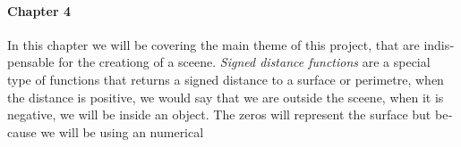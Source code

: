 \begin{otherlanguage}{english}
\paragraph{Chapter 4} In this chapter we will be covering the main theme of this project, that are indispensable for the creationg of a sceene. \textit{Signed distance functions} are a special type of functions that returns a signed distance to a surface or perimetre, when the distance is positive, we would say that we are outside the sceene, when it is negative, we will be inside an object. The zeros will represent the surface but because we will be using an numerical 

\vspace{0.7cm}

\end{otherlanguage}

\cleardoublepage




